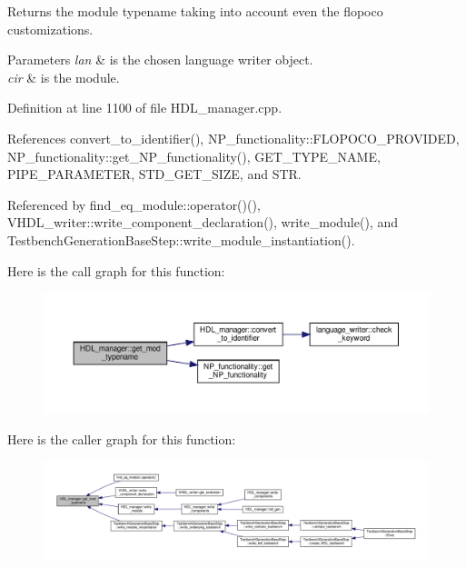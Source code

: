 Returns the module typename taking into account even the flopoco customizations. 


\begin{DoxyParams}{Parameters}
{\em lan} & is the chosen language writer object. \\
\hline
{\em cir} & is the module. \\
\hline
\end{DoxyParams}


Definition at line 1100 of file H\+D\+L\+\_\+manager.\+cpp.



References convert\+\_\+to\+\_\+identifier(), N\+P\+\_\+functionality\+::\+F\+L\+O\+P\+O\+C\+O\+\_\+\+P\+R\+O\+V\+I\+D\+ED, N\+P\+\_\+functionality\+::get\+\_\+\+N\+P\+\_\+functionality(), G\+E\+T\+\_\+\+T\+Y\+P\+E\+\_\+\+N\+A\+ME, P\+I\+P\+E\+\_\+\+P\+A\+R\+A\+M\+E\+T\+ER, S\+T\+D\+\_\+\+G\+E\+T\+\_\+\+S\+I\+ZE, and S\+TR.



Referenced by find\+\_\+eq\+\_\+module\+::operator()(), V\+H\+D\+L\+\_\+writer\+::write\+\_\+component\+\_\+declaration(), write\+\_\+module(), and Testbench\+Generation\+Base\+Step\+::write\+\_\+module\+\_\+instantiation().

Here is the call graph for this function\+:
\nopagebreak
\begin{figure}[H]
\begin{center}
\leavevmode
\includegraphics[width=350pt]{d7/d32/classHDL__manager_a94b432648de92166282cf3dc67524cec_cgraph}
\end{center}
\end{figure}
Here is the caller graph for this function\+:
\nopagebreak
\begin{figure}[H]
\begin{center}
\leavevmode
\includegraphics[width=350pt]{d7/d32/classHDL__manager_a94b432648de92166282cf3dc67524cec_icgraph}
\end{center}
\end{figure}
\mbox{\label{classHDL__manager_a5f8b1b3812244b35f3d58f639903e3d8}} 
